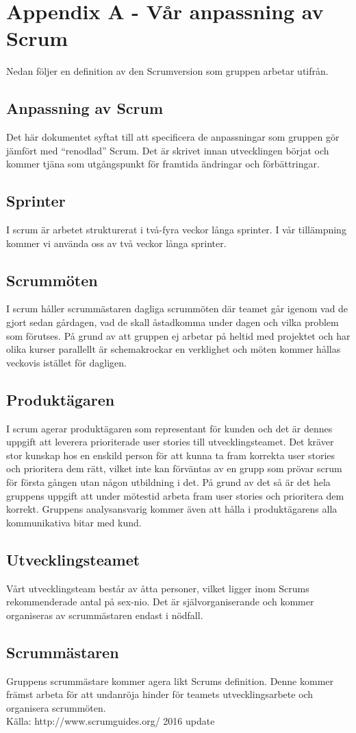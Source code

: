\section*{Appendix A - Vår anpassning av Scrum}
Nedan följer en definition av den Scrumversion som gruppen arbetar utifrån.

\subsection*{Anpassning av Scrum}
Det här dokumentet syftat till att specificera de anpassningar som gruppen gör jämfört med “renodlad” Scrum. Det är skrivet innan utvecklingen börjat och kommer tjäna som utgångspunkt för framtida ändringar och förbättringar.
\subsection*{Sprinter}
I scrum är arbetet strukturerat i två-fyra veckor långa sprinter. I vår tillämpning kommer vi använda oss av två veckor långa sprinter.
\subsection*{Scrummöten}
I scrum håller scrummästaren dagliga scrummöten där teamet går igenom vad de gjort sedan gårdagen, vad de skall åstadkomma under dagen och vilka problem som förutses. På grund av att gruppen ej arbetar på heltid med projektet och har olika kurser parallellt är schemakrockar en verklighet och möten kommer hållas veckovis istället för dagligen.
\subsection*{Produktägaren}
I scrum agerar produktägaren som representant för kunden och det är dennes uppgift att leverera prioriterade user stories till utvecklingsteamet. Det kräver stor kunskap hos en enskild person för att kunna ta fram korrekta user stories och prioritera dem rätt, vilket inte kan förväntas av en grupp som prövar scrum för första gången utan någon utbildning i det. På grund av det så är det hela gruppens uppgift att under mötestid arbeta fram user stories och prioritera dem korrekt. Gruppens analysansvarig kommer även att hålla i produktägarens alla kommunikativa bitar med kund.
\subsection*{Utvecklingsteamet}
Vårt utvecklingsteam består av åtta personer, vilket ligger inom Scrums rekommenderade antal på sex-nio. Det är självorganiserande och kommer organiseras av scrummästaren endast i nödfall.
\subsection*{Scrummästaren}
Gruppens scrummästare kommer agera likt Scrums definition. Denne kommer främst arbeta för att undanröja hinder för teamets utvecklingsarbete och organisera scrummöten.
\\
Källa: http://www.scrumguides.org/\cite{website:scrum_guide} 2016 update

